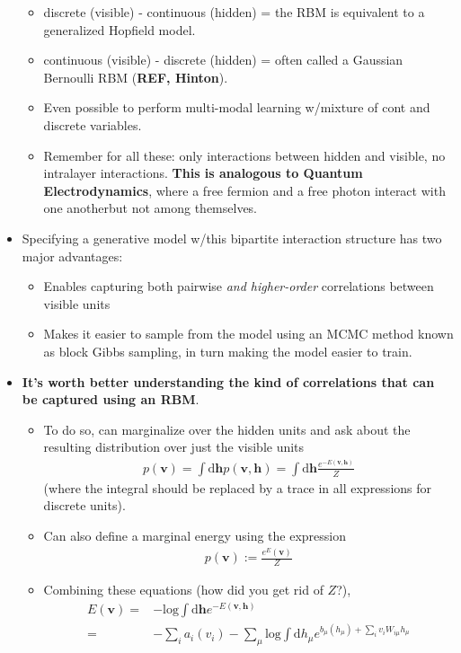 \documentclass[norsk,a4paper,11pt]{article}
\begin{document}
\begin{itemize}
\begin{itemize}
		\item discrete (visible) - continuous (hidden) = the RBM is equivalent to a generalized Hopfield model.
		\item continuous (visible) - discrete (hidden) = often called a Gaussian Bernoulli RBM (\textbf{REF, Hinton}).
		\item Even possible to perform multi-modal learning w/mixture of cont and discrete variables.
		\item Remember for all these: only interactions between hidden and visible, no intralayer interactions. \textbf{This is analogous to Quantum Electrodynamics}, where a free fermion and a free photon interact with one anotherbut not among themselves.
	\end{itemize}
	\item Specifying a generative model w/this bipartite interaction structure has two major advantages:
	\begin{itemize}
		\item Enables capturing both pairwise \textit{and higher-order} correlations between visible units
		\item Makes it easier to sample from the model using an MCMC method known as block Gibbs sampling, in turn making the model easier to train.
	\end{itemize}
	\item \textbf{It's worth better understanding the kind of correlations that can be captured using an RBM}. 
	\begin{itemize}
		\item To do so, can marginalize over the hidden units and ask about the resulting distribution over just the visible units
		\begin{align}
			p(\bm{v}) = \int \text{d} \bm{h} p(\bm{v}, \bm{h}) = \int \text{d}\bm{h} \frac{e^{-E(\bm{v}, \bm{h})}}{Z}
		\end{align}
		(where the integral should be replaced by a trace in all expressions for discrete units).
		\item Can also define a marginal energy using the expression
		\begin{align}
			p(\bm{v}) := \frac{e^E(\bm{v})}{Z} 
		\end{align}
		\item Combining these equations (how did you get rid of $Z$?),
		\begin{align}
			E(\bm{v}) =& -\text{log} \int \text{d}\bm{h} e^{-E(\bm{v}, \bm{h})} \\
			=& -\sum_i a_i (v_i) - \sum_\mu \text{log} \int \text{d} h_\mu e^{b_\mu (h_\mu) + \sum_i v_i W_{i\mu} h_\mu}

\end{align}
\end{itemize}
\end{itemize}
\end{document}
